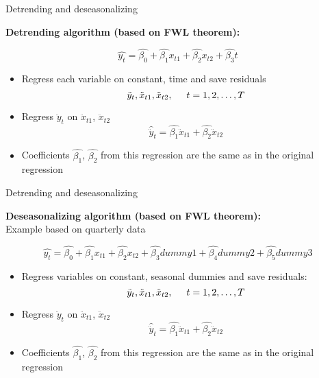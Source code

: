 \documentclass{beamer}
\begin{document}

\begin{frame}{Detrending and deseasonalizing}

\textbf{Detrending algorithm (based on FWL theorem):}

$$\hat{y_t}=\hat{\beta_0}+\hat{\beta_1}x_{t1}+\hat{\beta_2}x_{t2}+\hat{\beta_3}t$$

\begin{itemize}
\item Regress each variable on constant, time and save residuals $$\ddot{y}_{t}, \ddot{x}_{t1}, \ddot{x}_{t2}, \hspace{0.5cm} t=1,2,\dots, T$$
\item Regress $\ddot{y}_{t}$ on $\ddot{x}_{t1}$, $\ddot{x}_{t2}$
$$\hat{\ddot{y}}_{t}=\hat{\beta_1}\ddot{x}_{t1}+\hat{\beta_2}\ddot{x}_{t2}$$
\item Coefficients $\hat{\beta_1}$, $\hat{\beta_2}$ from this regression are the same as in the original regression 
\end{itemize}
\end{frame}


\begin{frame}{Detrending and deseasonalizing} 

\textbf{Deseasonalizing algorithm (based on FWL theorem):} \\
\footnotesize{Example based on quarterly data} 

$$\hat{y_t}=\hat{\beta_0}+\hat{\beta_1}x_{t1}+\hat{\beta_2}x_{t2}+\hat{\beta_3}dummy1+\hat{\beta_4}dummy2+\hat{\beta_5}dummy3$$

\begin{itemize}
\item Regress variables on constant, seasonal dummies and save residuals: $$\ddot{y}_{t}, \ddot{x}_{t1}, \ddot{x}_{t2}, \hspace{0.5cm} t=1, 2,\dots, T$$
\item Regress $\ddot{y}_{t}$ on $\ddot{x}_{t1}$, $\ddot{x}_{t2}$
$$\hat{\ddot{y}}_{t}=\hat{\beta_1}\ddot{x}_{t1}+\hat{\beta_2}\ddot{x}_{t2}$$
\item Coefficients $\hat{\beta_1}$, $\hat{\beta_2}$ from this regression are the same as in the original regression 
\end{itemize}
\end{frame}

\end{document}
